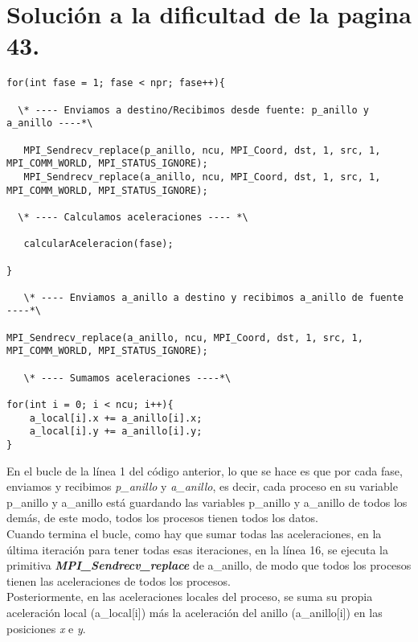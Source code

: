\documentclass[11pt]{article}
\begin{document}
\newpage
\section{Solución a la dificultad de la pagina 43.}
\begin{lstlisting}[style=C]
for(int fase = 1; fase < npr; fase++){

  \* ---- Enviamos a destino/Recibimos desde fuente: p_anillo y a_anillo ----*\

   MPI_Sendrecv_replace(p_anillo, ncu, MPI_Coord, dst, 1, src, 1, MPI_COMM_WORLD, MPI_STATUS_IGNORE);
   MPI_Sendrecv_replace(a_anillo, ncu, MPI_Coord, dst, 1, src, 1, MPI_COMM_WORLD, MPI_STATUS_IGNORE);

  \* ---- Calculamos aceleraciones ---- *\

   calcularAceleracion(fase);

}
	
   \* ---- Enviamos a_anillo a destino y recibimos a_anillo de fuente ----*\

MPI_Sendrecv_replace(a_anillo, ncu, MPI_Coord, dst, 1, src, 1, MPI_COMM_WORLD, MPI_STATUS_IGNORE);

   \* ---- Sumamos aceleraciones ----*\

for(int i = 0; i < ncu; i++){
	a_local[i].x += a_anillo[i].x;
	a_local[i].y += a_anillo[i].y;
}
\end{lstlisting}
En el bucle de la línea 1 del código anterior, lo que se hace es que por cada fase, enviamos y recibimos \textit{p\_anillo} y \textit{a\_anillo}, es decir, cada proceso en su variable p\_anillo y a\_anillo está guardando las variables p\_anillo y a\_anillo de todos los demás, de este modo, todos los procesos tienen todos los datos. \\

Cuando termina el bucle, como hay que sumar todas las aceleraciones, en la última iteración para tener todas esas iteraciones, en la línea 16, se ejecuta la primitiva \textbf{\textit{MPI\_Sendrecv\_replace}} de a\_anillo, de modo que todos los procesos tienen las aceleraciones de todos los procesos. \\

Posteriormente, en las aceleraciones locales del proceso, se suma su propia aceleración local (a\_local[i]) más la aceleración del anillo (a\_anillo[i]) en las posiciones \textit{x} e \textit{y}.
\end{document}
